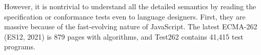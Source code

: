 However, it is nontrivial to understand all the detailed semantics by reading
the specification or conformance tests even to language designers.  First, they
are massive because of the fast-evolving nature of JavaScript.  The latest
ECMA-262 (ES12, 2021) is 879 pages with  algorithms, and Test262
contains 41,415 test programs.

% 
